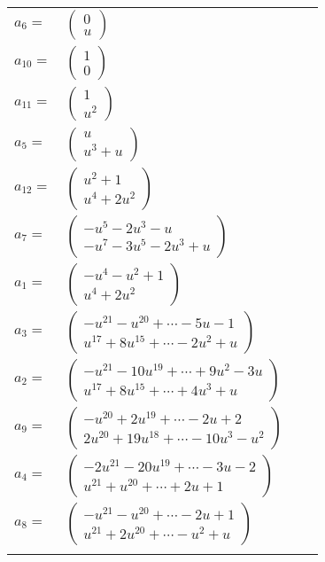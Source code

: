 \documentclass[1p]{elsarticle_modified}
\theoremstyle{definition}
\begin{document}
\begin{tabular}{m{7pt} m{180pt} m{7pt} m{180pt} }
\flushright $a_{6}=$&$\begin{pmatrix}0\\u\end{pmatrix}$ \\
\flushright $a_{10}=$&$\begin{pmatrix}1\\0\end{pmatrix}$ \\
\flushright $a_{11}=$&$\begin{pmatrix}1\\u^2\end{pmatrix}$ \\
\flushright $a_{5}=$&$\begin{pmatrix}u\\u^3+u\end{pmatrix}$ \\
\flushright $a_{12}=$&$\begin{pmatrix}u^2+1\\u^4+2 u^2\end{pmatrix}$ \\
\flushright $a_{7}=$&$\begin{pmatrix}- u^5-2 u^3- u\\- u^7-3 u^5-2 u^3+u\end{pmatrix}$ \\
\flushright $a_{1}=$&$\begin{pmatrix}- u^4- u^2+1\\u^4+2 u^2\end{pmatrix}$ \\
\flushright $a_{3}=$&$\begin{pmatrix}- u^{21}- u^{20}+\cdots-5 u-1\\u^{17}+8 u^{15}+\cdots-2 u^2+u\end{pmatrix}$ \\
\flushright $a_{2}=$&$\begin{pmatrix}- u^{21}-10 u^{19}+\cdots+9 u^2-3 u\\u^{17}+8 u^{15}+\cdots+4 u^3+u\end{pmatrix}$ \\
\flushright $a_{9}=$&$\begin{pmatrix}- u^{20}+2 u^{19}+\cdots-2 u+2\\2 u^{20}+19 u^{18}+\cdots-10 u^3- u^2\end{pmatrix}$ \\
\flushright $a_{4}=$&$\begin{pmatrix}-2 u^{21}-20 u^{19}+\cdots-3 u-2\\u^{21}+u^{20}+\cdots+2 u+1\end{pmatrix}$ \\
\flushright $a_{8}=$&$\begin{pmatrix}- u^{21}- u^{20}+\cdots-2 u+1\\u^{21}+2 u^{20}+\cdots- u^2+u\end{pmatrix}$\\&\end{tabular}
\end{document}
